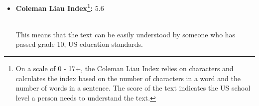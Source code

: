 \documentclass{article}
\begin{document}
\begin{appendix}
\begin{itemize}
\item \textbf{Coleman Liau Index\footnote{On a scale of 0 - 17+, the Coleman Liau Index relies on characters and calculates the index based on the number of characters in a word and the number of words in a sentence. The score of the text indicates the US school level a person needs to understand the text.}:} 5.6

\\This means that the text can be easily understood by someone who has passed grade 10, US education standards.

\end{itemize}

\end{appendix}

\clearpage
\end{document}
